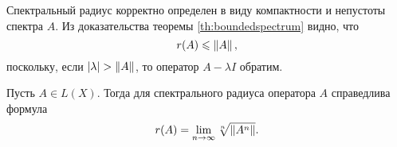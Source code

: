Спектральный радиус корректно определен в виду компактности и непустоты спектра $A$.
Из доказательства теоремы \ref{th:boundedspectrum} видно, что
\[ r(A) \leqslant \left\|A\right\|, \]
поскольку, если $\left|\lambda\right| > \left\|A\right\|$, то оператор $A- \lambda I$ обратим.

\begin{theorem}
    Пусть $A \in L(X)$. Тогда для спектрального радиуса оператора $A$ справедлива формула
    \[ r(A) = \lim_{n\to \infty} \sqrt[n]{\left\|A^n\right\|}. \]
\end{theorem}

\vspace{0.5cm}
